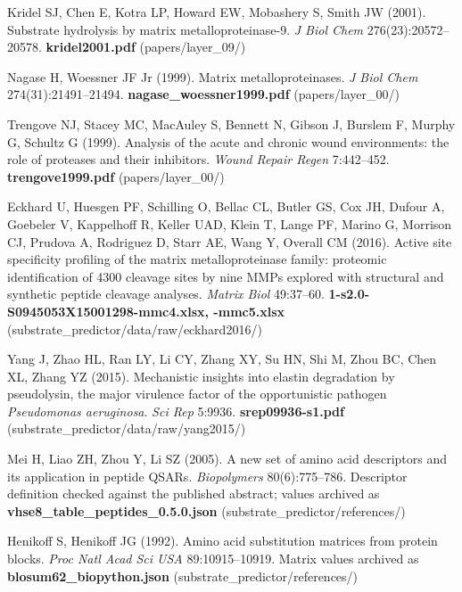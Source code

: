 \documentclass[10pt,a4paper]{article}
\numberwithin{equation}{section}
\begin{document}
\begin{enumerate}[label={[\arabic*]},noitemsep,leftmargin=*]
\item Kridel SJ, Chen E, Kotra LP, Howard EW, Mobashery S, Smith JW (2001).
  Substrate hydrolysis by matrix metalloproteinase-9.
  \textit{J Biol Chem} 276(23):20572--20578. \textbf{kridel2001.pdf}
  (papers/layer\_09/)

\item Nagase H, Woessner JF Jr (1999). Matrix metalloproteinases.
  \textit{J Biol Chem} 274(31):21491--21494. \textbf{nagase\_woessner1999.pdf}
  (papers/layer\_00/)

\item Trengove NJ, Stacey MC, MacAuley S, Bennett N, Gibson J, Burslem F,
  Murphy G, Schultz G (1999). Analysis of the acute and chronic wound
  environments: the role of proteases and their inhibitors.
  \textit{Wound Repair Regen} 7:442--452. \textbf{trengove1999.pdf}
  (papers/layer\_00/)

\item Eckhard U, Huesgen PF, Schilling O, Bellac CL, Butler GS, Cox JH, Dufour A,
  Goebeler V, Kappelhoff R, Keller UAD, Klein T, Lange PF, Marino G, Morrison CJ,
  Prudova A, Rodriguez D, Starr AE, Wang Y, Overall CM (2016). Active site
  specificity profiling of the matrix metalloproteinase family: proteomic
  identification of 4300 cleavage sites by nine MMPs explored with structural and
  synthetic peptide cleavage analyses. \textit{Matrix Biol} 49:37--60.
  \textbf{1-s2.0-S0945053X15001298-mmc4.xlsx, -mmc5.xlsx}
  (substrate\_predictor/data/raw/eckhard2016/)

\item Yang J, Zhao HL, Ran LY, Li CY, Zhang XY, Su HN, Shi M, Zhou BC, Chen XL,
  Zhang YZ (2015). Mechanistic insights into elastin degradation by pseudolysin,
  the major virulence factor of the opportunistic pathogen \textit{Pseudomonas
  aeruginosa}. \textit{Sci Rep} 5:9936. \textbf{srep09936-s1.pdf}
  (substrate\_predictor/data/raw/yang2015/)

\item Mei H, Liao ZH, Zhou Y, Li SZ (2005). A new set of amino acid descriptors
  and its application in peptide QSARs. \textit{Biopolymers} 80(6):775--786.
  Descriptor definition checked against the published abstract; values archived
  as \textbf{vhse8\_table\_peptides\_0.5.0.json} (substrate\_predictor/references/)

\item Henikoff S, Henikoff JG (1992). Amino acid substitution matrices from
  protein blocks. \textit{Proc Natl Acad Sci USA} 89:10915--10919. Matrix values
  archived as \textbf{blosum62\_biopython.json} (substrate\_predictor/references/)


\end{enumerate}
\end{document}
